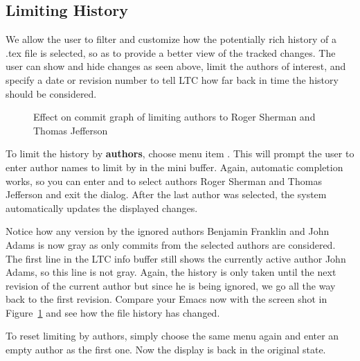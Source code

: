 \subsection{Limiting History} \label{sec:emacs-limit-history}

We allow the user to filter and customize how the potentially rich history of a .tex file is selected, so as to provide a better view of the tracked changes.  The user can show and hide changes as seen above, limit the authors of interest, and specify a date or revision number to tell LTC how far back in time the history should be considered.


\begin{figure}
\centering
{}
\caption{Effect on commit graph of limiting authors to Roger Sherman and Thomas Jefferson} \label{fig:emacs-limit-authors}
\end{figure}
To limit the history by \textbf{authors}, choose menu item . This will prompt the user to enter author names to limit by in the mini buffer.  Again, automatic completion works, so you can enter  and  to select authors Roger Sherman and Thomas Jefferson and exit the dialog.  After the last author was selected, the system automatically updates the displayed changes.

Notice how any version by the ignored authors Benjamin Franklin and John Adams is now gray as only commits from the selected authors are considered.  The first line in the LTC info buffer still shows the currently active author John Adams, so this line is not gray.  Again, the history is only taken until the next revision of the current author but since he is being ignored, we go all the way back to the first revision. Compare your Emacs now with the screen shot in Figure~\ref{fig:emacs-limit-authors} and see how the file history has changed.

To reset limiting by authors, simply choose the same menu  again and enter an empty author as the first one.  Now the display is back in the original state.


